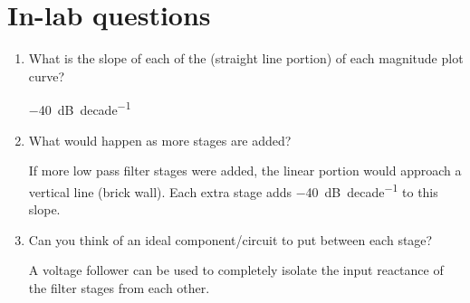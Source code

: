 \documentclass[CMPE]{../KGCOEReport}
\begin{document}
	\pagebreak

	\section*{In-lab questions}

	\begin{enumerate}
	\item{ What is the slope of each of the (straight line portion) of each magnitude plot curve?}

	\SI{-40}{\dB \per decade}
	

	\item{What would happen as more stages are added?}

	If more low pass filter stages were added, the linear portion would approach a vertical
	line (brick wall). Each extra stage adds \SI{-40}{\dB \per decade} to this slope.

	\item{Can you think of an ideal component/circuit to put between each stage?}

	A voltage follower can be used to completely isolate the input reactance of the
	filter stages from each other.

	\end{enumerate}


\end{document}
